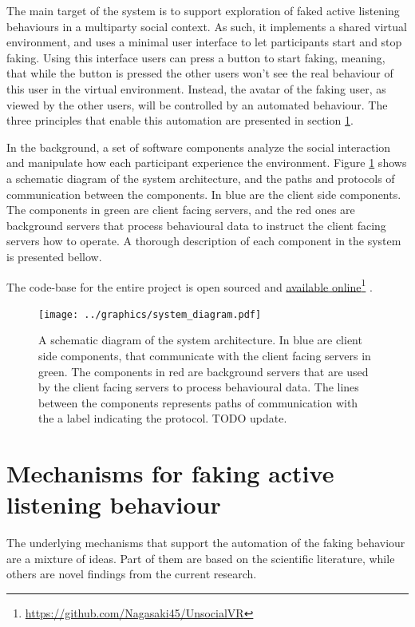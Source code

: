 \documentclass[]{simple-thesis}
\newcommand\fnurl[2]{%
  \href{#2}{#1}\footnote{\url{#2}}%
}
\begin{document}
The main target of the system is to support exploration of faked active listening behaviours in a multiparty social context.
As such, it implements a shared virtual environment, and uses a minimal user interface to let participants start and stop faking.
Using this interface users can press a button to start faking, meaning, that while the button is pressed the other users won't see the real behaviour of this user in the virtual environment.
Instead, the avatar of the faking user, as viewed by the other users, will be controlled by an automated behaviour.
The three principles that enable this automation are presented in section \ref{system:mechanisms}.

In the background, a set of software components analyze the social interaction and manipulate how each participant experience the environment.
Figure \ref{fig:system:diagram} shows a schematic diagram of the system architecture, and the paths and protocols of communication between the components.
In blue are the client side components.
The components in green are client facing servers, and the red ones are background servers that process behavioural data to instruct the client facing servers how to operate.
A thorough description of each component in the system is presented bellow.

The code-base for the entire project is open sourced and \fnurl{available online}{https://github.com/Nagasaki45/UnsocialVR}.

\begin{figure}
  \texttt{[image: ../graphics/system\_diagram.pdf]}
  \caption{A schematic diagram of the system architecture. In blue are client side components, that communicate with the client facing servers in green. The components in red are background servers that are used by the client facing servers to process behavioural data. The lines between the components represents paths of communication with the a label indicating the protocol. TODO update.}
  \label{fig:system:diagram}
\end{figure}

\section{Mechanisms for faking active listening behaviour}\label{system:mechanisms}

The underlying mechanisms that support the automation of the faking behaviour are a mixture of ideas.
Part of them are based on the scientific literature, while others are novel findings from the current research.
\end{document}
